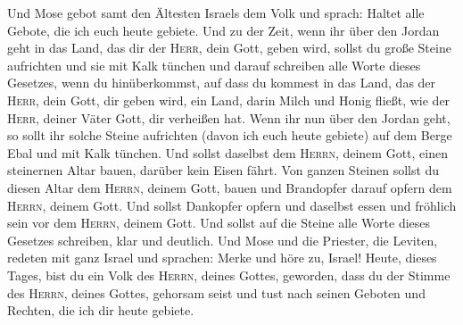  Und Mose gebot samt den Ältesten Israels dem Volk und
sprach: Haltet alle Gebote, die ich euch heute gebiete. 
Und zu der Zeit, wenn ihr über den Jordan geht in das Land, das dir der
\textsc{Herr}, dein Gott, geben wird, sollst du große Steine aufrichten
und sie mit Kalk tünchen  und darauf schreiben alle Worte
dieses Gesetzes, wenn du hinüberkommst, auf dass du kommest in das Land,
das der \textsc{Herr}, dein Gott, dir geben wird, ein Land, darin Milch
und Honig fließt, wie der \textsc{Herr}, deiner Väter Gott, dir
verheißen hat.  Wenn ihr nun über den Jordan geht, so
sollt ihr solche Steine aufrichten (davon ich euch heute gebiete) auf
dem Berge Ebal und mit Kalk tünchen.  Und sollst daselbst
dem \textsc{Herrn}, deinem Gott, einen steinernen Altar bauen, darüber
kein Eisen fährt.  Von ganzen Steinen sollst du diesen
Altar dem \textsc{Herrn}, deinem Gott, bauen und Brandopfer darauf
opfern dem \textsc{Herrn}, deinem Gott.  Und sollst
Dankopfer opfern und daselbst essen und fröhlich sein vor dem
\textsc{Herrn}, deinem Gott.  Und sollst auf die Steine
alle Worte dieses Gesetzes schreiben, klar und deutlich. 
Und Mose und die Priester, die Leviten, redeten mit ganz Israel und
sprachen: Merke und höre zu, Israel! Heute, dieses Tages, bist du ein
Volk des \textsc{Herrn}, deines Gottes, geworden,  dass
du der Stimme des \textsc{Herrn}, deines Gottes, gehorsam seist und tust
nach seinen Geboten und Rechten, die ich dir heute gebiete.

